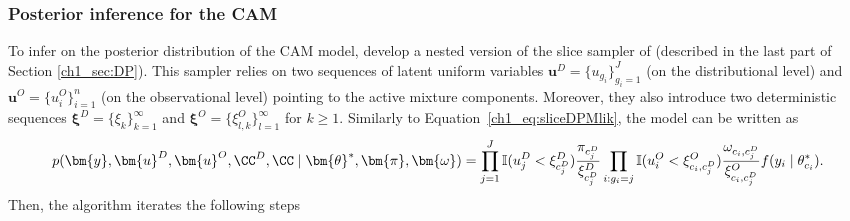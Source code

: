 \subsubsection*{Posterior inference for the CAM}
To infer on the posterior distribution of the CAM model, \citet{denti2021} develop a nested version of the slice sampler of \citet{kalli2011} (described in the last part of Section \ref{ch1_sec:DP}). This sampler relies on two sequences of latent uniform variables $\bm{u}^D = \{u_{g_i}\}_{g_i=1}^J$ (on the distributional level) and $\bm{u}^O = \{u^O_i\}_{i=1}^n$ (on the observational level) pointing to the active mixture components. Moreover, they also introduce two deterministic sequences $\bm{\xi}^D = \{\xi_k\}_{k=1}^{\infty}$ and $\bm{\xi}^O = \{\xi_{l,k}^O\}_{l=1}^{\infty}$ for $k\geq 1$.
Similarly to Equation~\ref{ch1_eq:sliceDPMlik}, the model can be written as 
\begin{equation*}
p(\bm{y}, \bm{u}^D, \bm{u}^O, \CC^D, \CC \mid \bm{\theta}^*, \bm{\pi}, \bm{\omega} ) = \prod_{j=1}^J \mathbb{I}(u^D_j < \xi^D_{c^D_j}) \frac{\pi_{c^D_j}}{\xi^D_{c^D_{j}}}  \prod_{i:g_i=j} \mathbb{I}(u_i^O < \xi_{c_i,c^D_j}^O) 
\frac{\omega_{c_i,c^D_j}}{\xi_{c_i,c^D_j}^O}
f(y_i\mid\theta^*_{c_i}).
\end{equation*}
Then, the algorithm iterates the following steps
